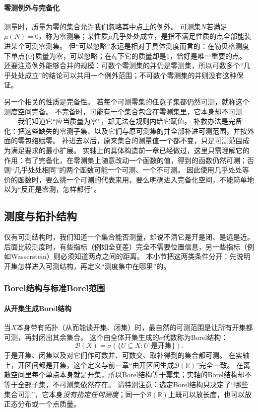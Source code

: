 \paragraph{零测例外与完备化}

测量时，质量为零的集合允许我们忽略其中点上的例外。
可测集$N$若满足$\mu(N)=0$，称为零测集；某性质$\mu$几乎处处成立，是指不满足性质的点全部能装进某个可测零测集。
但“可以忽略”永远是相对于具体测度而言的：在勒贝格测度下单点$\{0\}$质量为零，可以忽略；在$\delta_0$下它的质量却是$1$，恰好是唯一重要的点。
还要注意例外能够合并的规模：可数个零测集的并仍是零测集，所以可数多个“几乎处处成立”的结论可以共用一个例外范围；不可数个零测集的并则没有这种保证。

另一个相关的性质是完备性。
若每个可测零集的任意子集都仍然可测，就称这个测度空间完备。
不完备时，可能有一个集合包含在零测集里，它本身却不可测——我们知道它“应当质量为零”，却无法在规则内给它赋值。
补救办法是完备化：把这些缺失的零测子集、以及它们与原可测集的并全部补进可测范围，并按外面的零包络赋零。
补进去以后，原来集合的测量值一个都不变，只是可测范围成为满足要求的最小扩展。
实轴上的具体构造前一章已经做过，这里只需理解它的作用：有了完备化，在零测集上随意改动一个函数的值，得到的函数仍然可测；否则“几乎处处相同”的两个函数可能一个可测、一个不可测。
因此使用几乎处处等价的函数时，要么挑一个可测的代表来用，要么明确进入完备化空间，不能简单地以为“反正是零测，怎样都行”。

\subsection{测度与拓扑结构}

仅有可测结构时，我们知道一个集合能否测量，却说不清它是开是闭、是远是近。
后面比较测度时，有些指标（例如全变差）完全不需要位置信息，另一些指标（例如Wasserstein）则必须知道两点之间的距离。
本小节把这两类条件分开：先说明开集怎样进入可测结构，再定义“测度集中在哪里”的。

\subsubsection{Borel结构与标准Borel范围}

\paragraph{从开集生成Borel结构}

当$X$本身带有拓扑（从而能谈开集、闭集）时，最自然的可测范围是让所有开集都可测，再封闭出其余集合。
这个由全体开集生成的$\sigma$代数称为Borel结构：
\[
 \mathcal B(X)=\sigma(\{U\subseteq X:U\text{ 是开集}\}).
\]
于是开集、闭集以及对它们作可数并、可数交、取补得到的集合都可测。
在实轴上，开区间都是开集，这个定义与前一章“由开区间生成$\mathcal B(\mathbb R)$”完全一致。
在离散空间里每个单点本身就是开集，所以Borel结构等于幂集；实轴的Borel结构却不等于全部子集，不可测集依然存在。
请特别注意：选定Borel结构只决定了“哪些集合可测”，它本身\emph{没有指定任何测度}；同一个$\mathcal B(\mathbb R)$上既可以放长度，也可以放正态分布或一个点质量。

